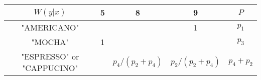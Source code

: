 \begin{tabular}{c|c|c|c||c|}
$W(y|x)$          & 5 & 8 & 9 & $P$\\
\hline
"AMERICANO" &   &  & 1  & $p_1$ \\
\hline
"MOCHA"     & 1 &   &    & $p_3$\\
\hline
"ESPRESSO" or "CAPPUCINO"  &   &  $p_4 / (p_2 + p_4)$  &  $p_2 / (p_2 + p_4)$  & $p_4 + p_2$\\
\hline
\end{tabular}
